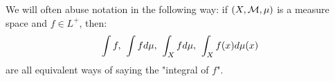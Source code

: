 \begin{remark}
We will often abuse notation in the following way: if $(X,\cM,\mu)$ is a measure space and $f \in L^+$, then:
    \begin{equation*}
    \begin{split}
        \int f, \h4 \int f d\mu , \h4 \int_X f d\mu , \h4 \int_X f(x) d\mu(x)
    \end{split}
    \end{equation*}
are all equivalent ways of saying the "integral of $f$".
\end{remark}

